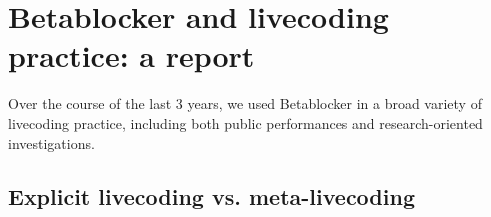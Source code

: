 \documentclass[letterpaper, 12pt]{article}
\begin{document}
% 
% 
% 
% 
% 
% 
% 
% 
% 
% 
% 
% 
% 




\section{Betablocker and livecoding practice: a report} 
\label{sec:betablocker_and_livecoding_practice_a_report}

Over the course of the last 3 years, we used Betablocker in a broad variety of livecoding practice, including both public performances and research-oriented investigations.


\subsection{Explicit livecoding vs. meta-livecoding} 
\label{sub:explicit_livecoding_meta_livecoding}

\end{document}
